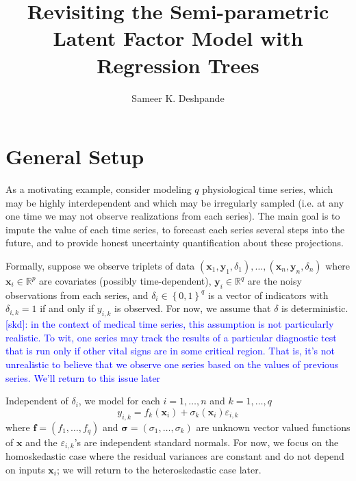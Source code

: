 \documentclass[12pt]{article}
\title{Revisiting the Semi-parametric Latent Factor Model with Regression Trees}
\author{Sameer K. Deshpande}
\begin{document}
\maketitle
\def\C{\mathbb{C}}
\def\R{\mathbb{R}}
\def\Q{\mathbb{Q}}
\def\Z{\mathbb{Z}}
\def\N{\text{N}}
\def\P{\mathbb{P}}
\def\E{\mathbb{E}}
\def\by{\mathbf{y}}
\def\bx{\mathbf{x}}
\def\bz{\mathbf{z}}
\def\bw{\mathbf{w}}
\def\br{\mathbf{r}}
\def\bu{\mathbf{u}}
\def\bY{\mathbf{Y}}
\def\bX{\mathbf{X}}
\def\bf{\mathbf{f}}
\def\bgamma{\boldsymbol{\gamma}}
\def\bSigma{\boldsymbol{\Sigma}}
\def\bsigma{\boldsymbol{\sigma}}
\def\bmu{\boldsymbol{\mu}}

\def\M{\mathcal{M}}
\def\T{\mathcal{T}}
\def\tilT{\tilde{T}}


\section{General Setup}
\label{sec:introduction}


As a motivating example, consider modeling $q$ physiological time series, which may be highly interdependent and which may be irregularly sampled (i.e. at any one time we may not observe realizations from each series).
The main goal is to impute the value of each time series, to forecast each series several steps into the future, and to provide honest uncertainty quantification about these projections.

Formally, suppose we observe triplets of data $(\bx_{1}, \by_{1}, \delta_{1}), \ldots, (\bx_{n}, \by_{n}, \delta_{n})$ where $\bx_{i} \in \R^{p}$ are covariates (possibly time-dependent), $\by_{i} \in \R^{q}$ are the noisy observations from each series, and $\delta_{i} \in \left\{0,1\right\}^{q}$ is a vector of indicators with $\delta_{i,k} = 1$ if and only if $y_{i,k}$ is observed.
For now, we assume that $\delta$ is deterministic.
\textcolor{blue}{[skd]: in the context of medical time series, this assumption is not particularly realistic. To wit, one series may track the results of a particular diagnostic test that is run only if other vital signs are in some critical region. That is, it's not unrealistic to believe that we observe one series based on the values of previous series. We'll return to this issue later}

Independent of $\delta_{i}$, we model for each $i = 1, \ldots, n$ and $k = 1, \ldots, q$ 
$$
y_{i,k} = f_{k}(\bx_{i}) + \sigma_{k}(\bx_{i})\varepsilon_{i,k}
$$
where $\bf = (f_{1}, \ldots, f_{q})$ and $\bsigma = (\sigma_{1}, \ldots, \sigma_{k})$ are unknown vector valued functions of $\bx$ and the $\varepsilon_{i,k}$'s are independent standard normals.
For now, we focus on the homoskedastic case where the residual variances are constant and do not depend on inputs $\bx_{i}$; we will return to the heteroskedastic case later.
\end{document}
